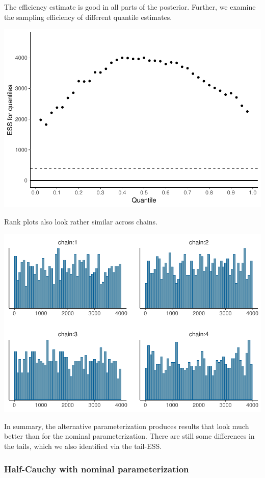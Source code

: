 \documentclass[american,]{article}
\begin{document}
The efficiency estimate is good in all parts of the posterior. Further,
we examine the sampling efficiency of different quantile estimates.

\includegraphics{graphics/quantile-ess-fit-alt1-1.pdf}

Rank plots also look rather similar across chains.

\includegraphics{graphics/hist-fit-alt1-1.pdf}

In summary, the alternative parameterization produces results that look
much better than for the nominal parameterization. There are still some
differences in the tails, which we also identified via the tail-ESS.

\hypertarget{half-cauchy-with-nominal-parameterization}{%
\subsubsection{Half-Cauchy with nominal
parameterization}\label{half-cauchy-with-nominal-parameterization}}
\end{document}
